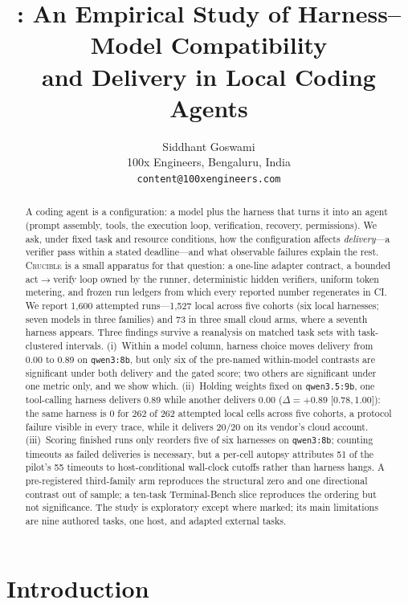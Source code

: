 \documentclass[10pt]{article}
\title{\textbf{\crucible{}: An Empirical Study of Harness--Model Compatibility\\ and Delivery in Local Coding Agents}}
\author{%
  Siddhant Goswami\\
  100x Engineers, Bengaluru, India\\
  \texttt{content@100xengineers.com}%
}
\date{}
\newcommand{\crucible}{\textsc{Crucible}}
\newcommand{\ci}[2]{[#1,\,#2]}
\begin{document}
\maketitle

\begin{abstract}
A coding agent is a configuration: a model plus the harness that turns it into an agent (prompt
assembly, tools, the execution loop, verification, recovery, permissions). We ask, under fixed
task and resource conditions, how the configuration affects \emph{delivery}---a verifier pass
within a stated deadline---and what observable failures explain the rest. \crucible{} is a
small apparatus for that question: a one-line adapter contract, a bounded act$\to$verify loop
owned by the runner, deterministic hidden verifiers, uniform token metering, and frozen run
ledgers from which every reported number regenerates in CI. We report 1{,}600 attempted
runs---1{,}527 local across five cohorts (six local harnesses; seven models in three families)
and 73 in three small cloud arms, where a seventh harness appears. Three findings survive a
reanalysis on matched task sets with task-clustered intervals. (i)~Within a model column,
harness choice moves delivery from 0.00 to 0.89 on \texttt{qwen3:8b}, but only six of the
pre-named within-model contrasts are significant under both delivery and the gated score; two
others are significant under one metric only, and we show which. (ii)~Holding weights fixed
on \texttt{qwen3.5:9b}, one tool-calling harness delivers
0.89 while another delivers 0.00 ($\Delta{=}{+}0.89$ \ci{0.78}{1.00}): the same harness is 0 for
262 of 262 attempted local cells across five cohorts, a protocol failure visible in every trace,
while it delivers 20/20 on its vendor's cloud account. (iii)~Scoring finished runs only reorders
five of six harnesses on \texttt{qwen3:8b}; counting timeouts as failed deliveries is
necessary, but a per-cell autopsy attributes 51 of the pilot's 55 timeouts to host-conditional
wall-clock cutoffs rather than harness hangs. A pre-registered third-family arm reproduces the
structural zero and one directional contrast out of sample; a ten-task Terminal-Bench slice
reproduces the ordering but not significance. The study is exploratory except where marked; its
main limitations are nine authored tasks, one host, and adapted external tasks.
\end{abstract}

\section{Introduction}
\label{sec:intro}
\end{document}
